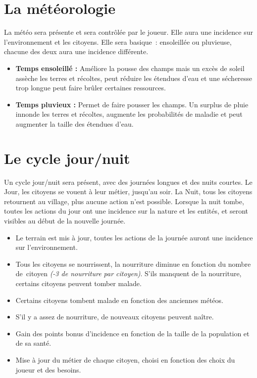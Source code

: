 \documentclass[a4paper]{article}
\begin{document}
    \section{La météorologie}
      La météo sera présente et sera contrôlée par le joueur. Elle aura une incidence sur l'environnement et les citoyens. Elle sera basique : ensoleillée ou pluvieuse, chacune des deux aura une incidence différente. 
      \begin{itemize} \small
        \item \textbf{Temps ensoleillé :} Améliore la pousse des champs mais un excès de soleil assèche les terres et récoltes, peut réduire les étendues d'eau et une sécheresse trop longue peut faire brûler certaines ressources.
        \item \textbf{Temps pluvieux :} Permet de faire pousser les champs. Un surplus de pluie innonde les terres et récoltes, augmente les probabilités de maladie et peut augmenter la taille des étendues d'eau.
      \end{itemize} \normalsize


    \section{Le cycle jour/nuit}
      \label{Cycle}
      Un cycle jour/nuit sera présent, avec des journées longues et des nuits courtes. Le Jour, les citoyens se vouent à leur métier, jusqu'au soir. La Nuit, tous les citoyens retournent au village, plus aucune action n'est possible. Lorsque la nuit tombe, toutes les actions du jour ont une incidence sur la nature et les entités, et seront visibles au début de la nouvelle journée.
      \begin{itemize} \small
        \item Le terrain est mis à jour, toutes les actions de la journée auront une incidence sur l'environnement.
        \item Tous les citoyens se nourrissent, la nourriture diminue en fonction du nombre de citoyen \textit{(-3 de nourriture par citoyen)}. S'ils manquent de la nourriture, certains citoyens peuvent tomber malade.
        \item Certains citoyens tombent malade en fonction des anciennes météos.
        \item S'il y a assez de nourriture, de nouveaux citoyens peuvent naître.
        \item Gain des points bonus d'incidence en fonction de la taille de la population et de sa santé.
        \item Mise à jour du métier de chaque citoyen, choisi en fonction des choix du joueur et des besoins.
      \end{itemize} \normalsize
\end{document}

